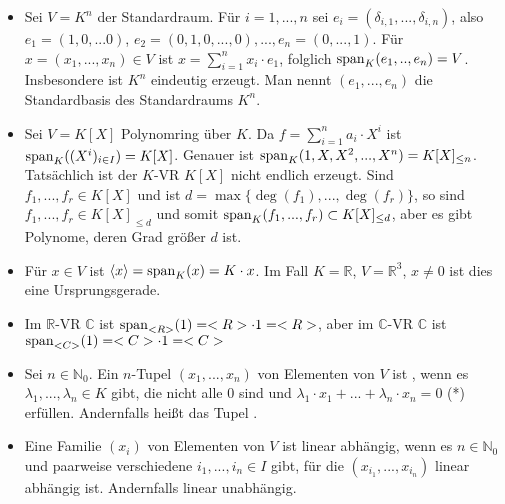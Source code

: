 \begin{example}
	\begin{itemize}
		\item Sei $V=K^n$ der Standardraum. Für $i=1,...,n$ sei $e_i=(\delta_{i,1},...,\delta_{i,n})$, also $e_1=(1,0,...0)$, 
		$e_2=(0,1,0,...,0),...,e_n=(0,...,1)$. Für $x=(x_1,...,x_n) \in V$ ist $x=\sum_{i=1}^n x_i\cdot e_1$, folglich 
		$\operatorname{span}_K(e_1,..,e_n)=V$. Insbesondere ist $K^n$ eindeutig erzeugt. Man nennt $(e_1,...,e_n)$ die Standardbasis des 
		Standardraums $K^n$.
		\item Sei $V=K[X]$ Polynomring über $K$. Da $f=\sum_{i=1}^n a_i\cdot X^i$ ist $\operatorname{span}_K((X^i)_{i \in I})=K[X]$. 
		Genauer ist $\operatorname{span}_K(1,X,X^2,...,X^n)=K[X]_{\le n}$. Tatsächlich ist der $K$-VR $K[X]$ nicht endlich erzeugt. Sind 
		$f_1,...,f_r \in K[X]$ und ist $d=\max\{\deg(f_1),...,\deg(f_r)\}$, so sind $f_1,...,f_r \in K[X]_{\le d}$ und somit 
		$\operatorname{span}_K(f_1,...,f_r) \subset K[X]_{\le d}$, aber es gibt Polynome, deren Grad größer $d$ ist.
		\item Für $x \in V$ ist $\langle x\rangle=\operatorname{span}_K(x)=K\cdot x$. Im Fall $K=\mathbb R$, $V=\mathbb R^3$, $x\neq 0$ ist dies eine 
		Ursprungsgerade.
		\item Im $\mathbb R$-VR $\mathbb C$ ist $\operatorname{span}_{<R>}(1)=<R>\cdot 1=<R>$, aber im $\mathbb C$-VR 
		$\mathbb C$ ist $\operatorname{span}_{<C>}(1)=<C>\cdot 1=<C>$
	\end{itemize}
\end{example}

\begin{definition}
	\begin{itemize}
		\item Sei $n\in \mathbb N_0$. Ein $n$-Tupel $(x_1,...,x_n)$ von Elementen von $V$ ist , wenn es 
		$\lambda_1,...,\lambda_n \in K$ gibt, die nicht alle 0 sind und $\lambda_1\cdot x_1+...+\lambda_n\cdot x_n=0$ (*) 
		erfüllen. Andernfalls heißt das Tupel .
		\item Eine Familie $(x_i)$ von Elementen von $V$ ist linear abhängig, wenn es $n\in \mathbb N_0$ und paarweise 
		verschiedene $i_1,...,i_n \in I$ gibt, für die $(x_{i_1},...,x_{i_n})$ linear abhängig ist. Andernfalls linear 
		unabhängig.
	\end{itemize}
\end{definition}

